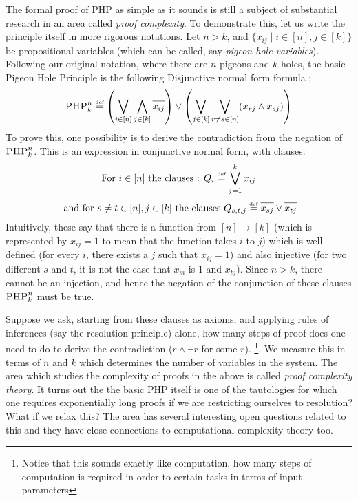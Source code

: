 \begin{curiosity}
The formal proof of PHP as simple as it sounds is still a subject of substantial research in an area called \textit{proof complexity}. To demonstrate this, let us write the principle itself in more rigorous notations. Let $n > k$, and $\{ x_{ij} \mid  i \in [n], j \in [k] \}$ be propositional variables (which can be called, say {\em pigeon hole variables}). Following our original notation, where there are $n$ pigeons and $k$ holes, the basic Pigeon Hole Principle is the following Disjunctive normal form formula : 
$$\textrm{\sc PHP}_k^n \defn \left( \bigvee_{i \in [n]} \bigwedge_{j \in [k]} \bar{x_{ij}} \right) \lor \left( \bigvee_{j \in [k]} \bigvee_{r \ne s \in [n]} (x_{rj} \land x_{sj}) \right) $$
To prove this, one possibility is to derive the contradiction from the negation of 
$\textrm{\sc PHP}_k^n$. This is an expression in conjunctive normal form, with clauses:
$$ \textrm{For $i \in [n]$ the clauses : } Q_i \stackrel{\text{\tiny def}}{=} \bigvee_{j=1}^k x_{ij} $$
$$\textrm{ and for $s \ne t \in [n], j \in [k]$ the clauses } Q_{s,t,j} \defn \bar{x_{sj}} \lor \bar{x_{tj}}$$
Intuitively,  these say that there is a function from $[n] \to [k]$ (which is represented by $x_{ij}=1$ to mean that the function takes $i$ to $j$) which is well defined (for every $i$, there exists a $j$ such that $x_{ij} = 1$) and also injective (for two different $s$ and $t$, it is not the case that $x_{si}$ is $1$ and $x_{tj}$).
Since $n > k$, there cannot be an injection, and hence the negation of the conjunction of these clauses $\textrm{\sc PHP}_k^n$ must be true.

Suppose we ask, starting from these clauses as axioms, and applying rules of inferences (say the resolution principle) alone, how many steps of proof does one need to do to derive the contradiction ($r \land \lnot r$ for some $r$). \footnote{Notice that this sounds exactly like computation, how many steps of computation is required in order to certain tasks in terms of input parameters}. We measure this in terms of $n$ and $k$ which determines the number of variables in the system. The area which studies the complexity of proofs in the above is called {\em proof complexity theory}. It turns out the the basic PHP itself is one of the tautologies for which one requires exponentially long proofs if we are restricting ourselves to resolution? What if we relax this? The area has several interesting open questions related to this and they have close connections to computational complexity theory too.
\end{curiosity}

